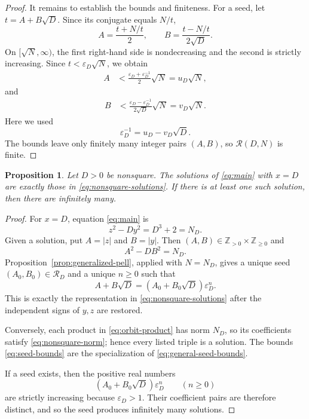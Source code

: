 \documentclass[a4paper,11pt]{amsart}
\numberwithin{equation}{section}
\newtheorem{proposition}[theorem]{Proposition}
\theoremstyle{definition}
\theoremstyle{remark}
\newcommand{\Z}{\mathbb Z}
\newcommand{\eps}{\varepsilon}
\newcommand{\Rcal}{\mathcal R}
\begin{document}
\begin{proof}
It remains to establish the bounds and finiteness.  For a seed, let
\(t=A+B\sqrt D\).  Since its conjugate equals \(N/t\),
\begin{equation}\label{eq:ABfromt}
 A=\frac{t+N/t}{2},
 \qquad
 B=\frac{t-N/t}{2\sqrt D}.
\end{equation}
On \([\sqrt N,\infty)\), the first right-hand side is nondecreasing and the
second is strictly increasing.  Since \(t<\eps_D\sqrt N\), we obtain
\begin{align}\label{eq:A-bound-calc}
 A
 &<\frac{\eps_D+\eps_D^{-1}}2\sqrt N
 =u_D\sqrt N,
\end{align}
and
\begin{align}\label{eq:B-bound-calc}
 B
 &<\frac{\eps_D-\eps_D^{-1}}{2\sqrt D}\sqrt N
 =v_D\sqrt N.
\end{align}
Here we used
\begin{equation*}
 \eps_D^{-1}=u_D-v_D\sqrt D.
\end{equation*}
The bounds leave only finitely many integer pairs \((A,B)\), so
\(\Rcal(D,N)\) is finite.
\end{proof}

\begin{proposition}\label{prop:nonsquare-case}
Let \(D>0\) be nonsquare.  The solutions of \eqref{eq:main} with \(x=D\)
are exactly those in \eqref{eq:nonsquare-solutions}.  If there is at least
one such solution, then there are infinitely many.
\end{proposition}

\begin{proof}
For \(x=D\), equation \eqref{eq:main} is
\begin{equation}\label{eq:nonsquare-norm}
 z^2-Dy^2=D^3+2=N_D.
\end{equation}
Given a solution, put \(A=|z|\) and \(B=|y|\).  Then
\((A,B)\in\Z_{>0}\times\Z_{\geq0}\) and
\begin{equation*}
 A^2-DB^2=N_D.
\end{equation*}
Proposition~\ref{prop:generalized-pell}, applied with \(N=N_D\), gives a
unique seed \((A_0,B_0)\in\Rcal_D\) and a unique \(n\geq0\) such that
\begin{equation*}
 A+B\sqrt D=(A_0+B_0\sqrt D)\eps_D^n.
\end{equation*}
This is exactly the representation in \eqref{eq:nonsquare-solutions} after
the independent signs of \(y,z\) are restored.

Conversely, each product in \eqref{eq:orbit-product} has norm \(N_D\), so
its coefficients satisfy \eqref{eq:nonsquare-norm}; hence every listed triple
is a solution.  The bounds \eqref{eq:seed-bounds} are the specialization of
\eqref{eq:general-seed-bounds}.

If a seed exists, then the positive real numbers
\begin{equation*}
 (A_0+B_0\sqrt D)\eps_D^n
 \qquad(n\geq0)
\end{equation*}
are strictly increasing because \(\eps_D>1\).  Their coefficient pairs are
therefore distinct, and so the seed produces infinitely many solutions.
\end{proof}
\end{document}
